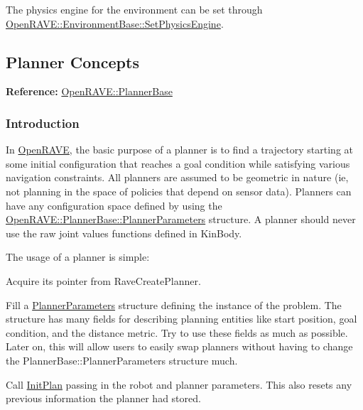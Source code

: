 The physics engine for the environment can be set through \hyperlink{classOpenRAVE_1_1EnvironmentBase_a4b682d62526e5840d8fdc25343ee563c}{OpenRAVE::EnvironmentBase::SetPhysicsEngine}. \hypertarget{arch_planner}{}\subsection{Planner Concepts}\label{arch_planner}
{\bfseries Reference:} \hyperlink{classOpenRAVE_1_1PlannerBase}{OpenRAVE::PlannerBase}\hypertarget{arch__planner_planner_intro}{}\subsubsection{Introduction}\label{arch__planner_planner_intro}
In \hyperlink{namespaceOpenRAVE}{OpenRAVE}, the basic purpose of a planner is to find a trajectory starting at some initial configuration that reaches a goal condition while satisfying various navigation constraints. All planners are assumed to be geometric in nature (ie, not planning in the space of policies that depend on sensor data). Planners can have any configuration space defined by using the \hyperlink{classOpenRAVE_1_1PlannerBase_1_1PlannerParameters}{OpenRAVE::PlannerBase::PlannerParameters} structure. A planner should never use the raw joint values functions defined in KinBody.

The usage of a planner is simple:


\begin{DoxyItemize}
\item Acquire its pointer from RaveCreatePlanner.
\end{DoxyItemize}


\begin{DoxyItemize}
\item Fill a \hyperlink{classOpenRAVE_1_1PlannerBase_1_1PlannerParameters}{PlannerParameters} structure defining the instance of the problem. The structure has many fields for describing planning entities like start position, goal condition, and the distance metric. Try to use these fields as much as possible. Later on, this will allow users to easily swap planners without having to change the PlannerBase::PlannerParameters structure much.
\end{DoxyItemize}


\begin{DoxyItemize}
\item Call \hyperlink{classOpenRAVE_1_1PlannerBase_a109c37d3de7ee99f93c740a2df0e5e34}{InitPlan} passing in the robot and planner parameters. This also resets any previous information the planner had stored.
\end{DoxyItemize}


